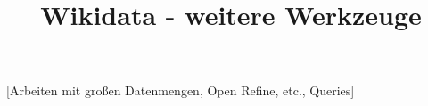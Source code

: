 \documentclass{article}
\begin{document}
\title{Wikidata - weitere Werkzeuge}

\maketitle





[Arbeiten mit großen Datenmengen, Open Refine, etc., Queries]
\end{document}
